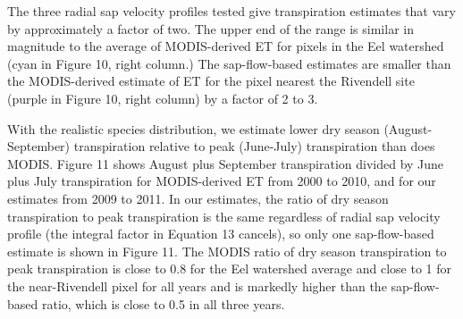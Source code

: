 The three radial sap velocity profiles tested give transpiration estimates that vary by approximately a factor of two.  The upper end of the range is similar in magnitude to the average of MODIS-derived ET for pixels in the Eel watershed (cyan in Figure 10, right column.)  The sap-flow-based estimates are smaller than the MODIS-derived estimate of ET for the pixel nearest the Rivendell site (purple in Figure 10, right column) by a factor of 2 to 3.

With the realistic species distribution, we estimate lower dry season (August-September) transpiration relative to peak (June-July) transpiration than does MODIS.  Figure 11 shows August plus September transpiration divided by June plus July transpiration for MODIS-derived ET from 2000 to 2010, and for our estimates from 2009 to 2011.  In our estimates, the ratio of dry season transpiration to peak transpiration is the same regardless of radial sap velocity profile (the integral factor in Equation 13 cancels), so only one sap-flow-based estimate is shown in Figure 11.  The MODIS ratio of dry season transpiration to peak transpiration is close to 0.8 for the Eel watershed average and close to 1 for the near-Rivendell pixel for all years and is markedly higher than the sap-flow-based ratio, which is close to 0.5 in all three years.


